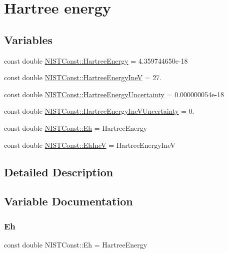 \hypertarget{group___hartree_energy}{}\section{Hartree energy}
\label{group___hartree_energy}
\subsection*{Variables}
\begin{DoxyCompactItemize}
\item 
const double \hyperlink{group___hartree_energy_gab58dc1c4e59e83d4fb1217778fe9f29b}{N\+I\+S\+T\+Const\+::\+Hartree\+Energy} = 4.\+359744650e-\/18
\item 
const double \hyperlink{group___hartree_energy_ga400eb5b8c9b55b0f601870ba54120364}{N\+I\+S\+T\+Const\+::\+Hartree\+Energy\+IneV} = 27.
\item 
const double \hyperlink{group___hartree_energy_gaabdf38a4c491ca0f606bf042c8479801}{N\+I\+S\+T\+Const\+::\+Hartree\+Energy\+Uncertainty} = 0.\+000000054e-\/18
\item 
const double \hyperlink{group___hartree_energy_gaa6e7ae83f510023bdd88d80dae80f97d}{N\+I\+S\+T\+Const\+::\+Hartree\+Energy\+Ine\+V\+Uncertainty} = 0.
\item 
const double \hyperlink{group___hartree_energy_ga1955ca3dc0e0714b0caa7304e7389140}{N\+I\+S\+T\+Const\+::\+Eh} = Hartree\+Energy
\item 
const double \hyperlink{group___hartree_energy_ga45991f1895507078b66f94f85e2e8af5}{N\+I\+S\+T\+Const\+::\+Eh\+IneV} = Hartree\+Energy\+IneV
\end{DoxyCompactItemize}


\subsection{Detailed Description}


\subsection{Variable Documentation}
\mbox{\label{group___hartree_energy_ga1955ca3dc0e0714b0caa7304e7389140}} 
\subsubsection{\texorpdfstring{Eh}{Eh}}
{\footnotesize\ttfamily const double N\+I\+S\+T\+Const\+::\+Eh = Hartree\+Energy}

